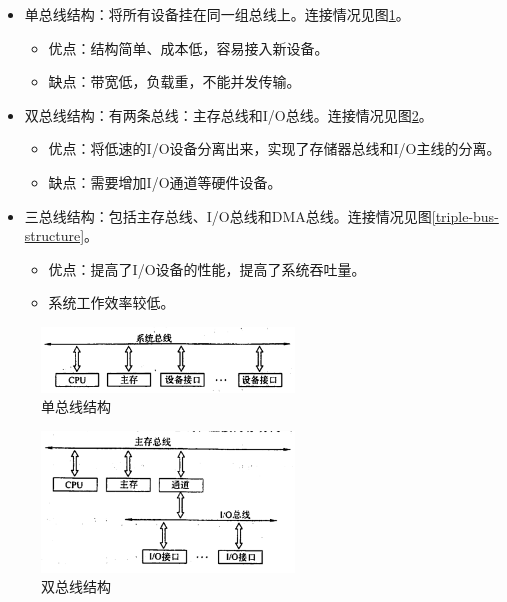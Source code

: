 \documentclass[12pt, a4paper, oneside]{ctexart}
\begin{document}
\begin{itemize}
  \item 单总线结构：将所有设备挂在同一组总线上。连接情况见图\ref{single-bus-structure}。
  \begin{itemize}
    \item 优点：结构简单、成本低，容易接入新设备。
    \item 缺点：带宽低，负载重，不能并发传输。
  \end{itemize}
  \item 双总线结构：有两条总线：主存总线和I/O总线。连接情况见图\ref{double-bus-structure}。
  \begin{itemize}
    \item 优点：将低速的I/O设备分离出来，实现了存储器总线和I/O主线的分离。
    \item 缺点：需要增加I/O通道等硬件设备。
  \end{itemize}
  \item 三总线结构：包括主存总线、I/O总线和DMA总线。连接情况见图\ref{triple-bus-structure}。
  \begin{itemize}
    \item 优点：提高了I/O设备的性能，提高了系统吞吐量。
    \item 系统工作效率较低。
  \end{itemize}
\end{itemize}

\begin{figure}
  \centering
  \includegraphics[width=0.6\textwidth]{./images/single-bus-structure.png}
  \caption{单总线结构}
  \label{single-bus-structure}
\end{figure}

\begin{figure}
  \centering
  \includegraphics[width=0.6\textwidth]{./images/double-bus-structure.png}
  \caption{双总线结构}
  \label{double-bus-structure}
\end{figure}
\end{document}
